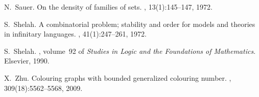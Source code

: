 \documentclass[11pt, fleqn]{article}
\theoremstyle{plain}
\theoremstyle{nonumberplain}
\begin{document}
\begin{thebibliography}{10}
N.~Sauer.
\newblock On the density of families of sets.
, 13(1):145--147,
  1972.

S.~Shelah.
\newblock A combinatorial problem; stability and order for models and theories
  in infinitary languages.
, 41(1):247--261, 1972.

S.~Shelah.
,
  volume~92 of {\em Studies in Logic and the Foundations of Mathematics}.
\newblock Elsevier, 1990.

X.~Zhu.
\newblock Colouring graphs with bounded generalized colouring number.
, 309(18):5562--5568, 2009.

\end{thebibliography}
\end{document}
